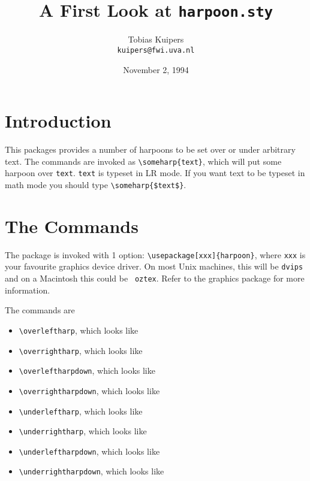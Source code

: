 \documentclass{article}
\title{A First Look at {\tt harpoon.sty}}
\author{Tobias Kuipers\\ {\tt kuipers@fwi.uva.nl}}
\date{November 2, 1994}
\begin{document}
\maketitle

\section{Introduction}

This packages provides a number of harpoons to be set over or under
arbitrary text. The commands are invoked as \verb+\someharp{text}+,
which will put some harpoon over {\tt text}. {\tt text} is typeset in LR
mode. If you want text to be typeset in math mode you should type
\verb+\someharp{$text$}+. 

\section{The Commands}

The package is invoked with 1 option: \verb+\usepackage[xxx]{harpoon}+,
where {\tt xxx} is your favourite graphics device driver. On most Unix
machines, this will be {\tt dvips} and on a Macintosh this could be {\tt
oztex}. Refer to the graphics package for more information.

The commands are
\begin{itemize}
	\item \verb+\overleftharp+, which looks like 
	\item \verb+\overrightharp+, which looks like 
	\item \verb+\overleftharpdown+, which looks like 
	\item \verb+\overrightharpdown+, which looks like 
	\item \verb+\underleftharp+, which looks like 
	\item \verb+\underrightharp+, which looks like 
	\item \verb+\underleftharpdown+, which looks like 
	\item \verb+\underrightharpdown+, which looks like 
\end{itemize}
\end{document}

